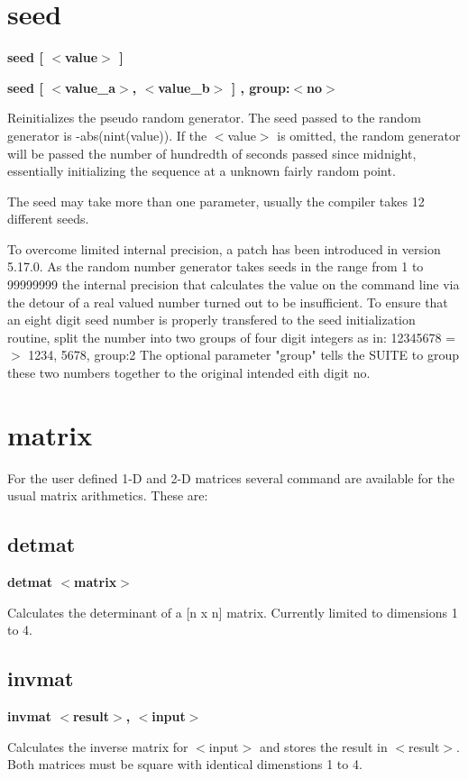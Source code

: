 \section{seed}
{\bf seed [ $ <$value$> $ ] \par }
{\bf seed [ $ <$value\_a$> $, $ <$value\_b$> $ ] , group:$ <$no$> $ \par }
\par
\vspace{3pt}
Reinitializes the pseudo random generator. The seed passed to the 
random generator is -abs(nint(value)). If the $ <$value$> $ is omitted, 
the random generator will be passed the number of hundredth of 
seconds passed since midnight, essentially initializing the sequence 
at a unknown fairly random point. 
\par
The seed may take more than one parameter, usually the compiler 
takes 12 different seeds. 
\par
To overcome limited internal precision, a patch has been introduced 
in version 5.17.0. 
As the random number generator takes seeds in the range from 
1 to 99999999 the internal precision that calculates the value 
on the command line via the detour of a real valued number turned 
out to be insufficient. To ensure that an eight digit seed number 
is properly transfered to the seed initialization routine, split 
the number into two groups of four digit integers as in: 
12345678  =$> $ 1234, 5678, group:2 
The optional parameter "group" tells the SUITE to group these two 
numbers together to the original intended eith digit no. 
\section{matrix}
\par
For the user defined 1-D and 2-D matrices several command are 
available for the usual matrix arithmetics. These are: 
\subsection*{detmat}
{\bf detmat $ <$matrix$> $ \par }
\par
\vspace{3pt}
Calculates the determinant of a [n x n] matrix. Currently limited 
to dimensions 1 to 4. 
\subsection*{invmat}
{\bf invmat $ <$result$> $, $ <$input$> $ \par }
\par
\vspace{3pt}
Calculates the inverse matrix for $ <$input$> $ and stores the result 
in $ <$result$> $. Both matrices must be square with identical 
dimenstions 1 to 4. 
